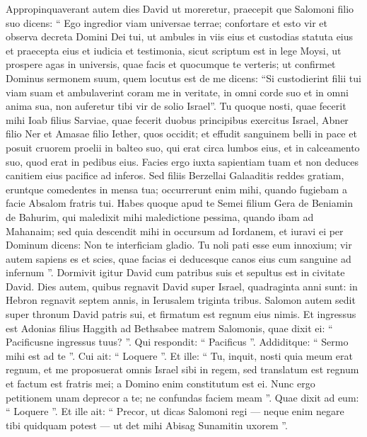 \begin{biblechapter}
\begin{biblechapter}
\verse Appropinquaverant autem dies David ut moreretur, praecepit que Salomoni filio suo dicens: 
\verse “ Ego ingredior viam universae terrae; confortare et esto vir 
\verse et observa decreta Domini Dei tui, ut ambules in viis eius et custodias statuta eius et praecepta eius et iudicia et testimonia, sicut scriptum est in lege Moysi, ut prospere agas in universis, quae facis et quocumque te verteris; 
\verse ut confirmet Dominus sermonem suum, quem locutus est de me dicens: “Si custodierint filii tui viam suam et ambulaverint coram me in veritate, in omni corde suo et in omni anima sua, non auferetur tibi vir de solio Israel”.
 \verse Tu quoque nosti, quae fecerit mihi Ioab filius Sarviae, quae fecerit duobus principibus exercitus Israel, Abner filio Ner et Amasae filio Iether, quos occidit; et effudit sanguinem belli in pace et posuit cruorem proelii in balteo suo, qui erat circa lumbos eius, et in calceamento suo, quod erat in pedibus eius. 
\verse Facies ergo iuxta sapientiam tuam et non deduces canitiem eius pacifice ad inferos. 
\verse Sed filiis Berzellai Galaaditis reddes gratiam, eruntque comedentes in mensa tua; occurrerunt enim mihi, quando fugiebam a facie Absalom fratris tui. 
\verse Habes quoque apud te Semei filium Gera de Beniamin de Bahurim, qui maledixit mihi maledictione pessima, quando ibam ad Mahanaim; sed quia descendit mihi in occursum ad Iordanem, et iuravi ei per Dominum dicens: Non te interficiam gladio. 
\verse Tu noli pati esse eum innoxium; vir autem sapiens es et scies, quae facias ei deducesque canos eius cum sanguine ad infernum ”.
 \verse Dormivit igitur David cum patribus suis et sepultus est in civitate David. 
 \verse Dies autem, quibus regnavit David super Israel, quadraginta anni sunt: in Hebron regnavit septem annis, in Ierusalem triginta tribus. 
\verse Salomon autem sedit super thronum David patris sui, et firmatum est regnum eius nimis.
 \verse Et ingressus est Adonias filius Haggith ad Bethsabee matrem Salomonis, quae dixit ei: “ Pacificusne ingressus tuus? ”. Qui respondit: “ Pacificus ”. 
\verse Addiditque: “ Sermo mihi est ad te ”. Cui ait: “ Loquere ”. Et ille: 
\verse “ Tu, inquit, nosti quia meum erat regnum, et me proposuerat omnis Israel sibi in regem, sed translatum est regnum et factum est fratris mei; a Domino enim constitutum est ei. 
\verse Nunc ergo petitionem unam deprecor a te; ne confundas faciem meam ”. Quae dixit ad eum: “ Loquere ”. 
\verse Et ille ait: “ Precor, ut dicas Salomoni regi — neque enim negare tibi quidquam potest — ut det mihi Abisag Sunamitin uxorem ”. 

\end{biblechapter}
\end{biblechapter}
